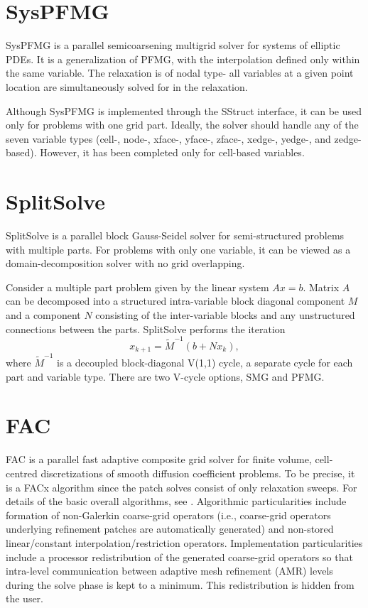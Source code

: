 \section{SysPFMG}

SysPFMG is a parallel semicoarsening multigrid solver for systems of 
elliptic PDEs. It is a generalization of PFMG, with the interpolation
defined only within the same variable. The relaxation is of nodal type-
all variables at a given point location are simultaneously solved for in the
relaxation.

Although SysPFMG is implemented through the SStruct interface, it can
be used only for problems with one grid part. Ideally, the solver should
handle any of the seven variable types (cell-, node-, xface-, yface-, zface-,
xedge-, yedge-, and zedge-based). However, it has been completed only for cell-based
variables.


\section{SplitSolve}

SplitSolve is a parallel block Gauss-Seidel solver for semi-structured
problems with multiple parts. For problems with only one variable, it can be viewed as 
a domain-decomposition solver with no grid overlapping.

Consider a multiple part problem given by the linear system $Ax=b$. Matrix $A$ can
be decomposed into a structured intra-variable block diagonal component $M$ and a
component $N$ consisting of the inter-variable blocks and any unstructured connections
between the parts. SplitSolve performs the iteration 
\[ x_{k+1} = \tilde{M}^{-1} (b + N x_k),\]
where $\tilde{M}^{-1}$ is a decoupled block-diagonal V(1,1) cycle, a separate cycle for each
part and variable type. There are two V-cycle options, SMG and PFMG.


\section{FAC}

FAC is a parallel fast adaptive composite grid solver for finite volume,
cell-centred discretizations of smooth diffusion coefficient problems. 
To be precise, it is a FACx algorithm since the patch solves consist of only
relaxation sweeps. For details of the basic overall algorithms, see \cite{SFMcCormick_1989a}.
Algorithmic particularities include formation of non-Galerkin coarse-grid operators
(i.e., coarse-grid operators underlying refinement patches are automatically generated)
and non-stored linear/constant interpolation/restriction operators. Implementation particularities
include a processor redistribution of the generated coarse-grid operators so that intra-level 
communication between adaptive mesh refinement (AMR) levels during the solve phase
is kept to a minimum. This redistribution is hidden from the user.

